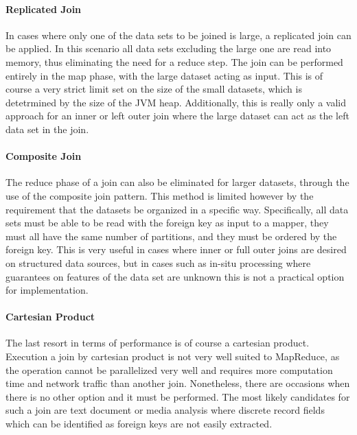 \paragraph{Replicated Join}
In cases where only one of the data sets to be joined is large, a replicated join can be applied. In this scenario all data sets excluding the large one are read into memory, thus eliminating the need for a reduce step. The join can be performed entirely in the map phase, with the large dataset acting as input. This is of course a very strict limit set on the size of the small datasets, which is detetrmined by the size of the JVM heap. Additionally, this is really only a valid approach for an inner or left outer join where the large dataset can act as the left data set in the join. 

\paragraph{Composite Join}
The reduce phase of a join can also be eliminated for larger datasets, through the use of the composite join pattern. This method is limited however by the requirement that the datasets be organized in a specific way. Specifically, all data sets must be able to be read with the foreign key as input to a mapper, they must all have the same number of partitions, and they must be ordered by the foreign key. This is very useful in cases where inner or full outer joins are desired on structured data sources, but in cases such as in-situ processing where guarantees on features of the data set are unknown this is not a practical option for implementation.

\paragraph{Cartesian Product}
The last resort in terms of performance is of course a cartesian product. Execution a join by cartesian product is not very well suited to MapReduce, as the operation cannot be parallelized very well and requires more computation time and network traffic than another join. Nonetheless, there are occasions when there is no other option and it must be performed. The most likely candidates for such a join are text document or media analysis where discrete record fields which can be identified as foreign keys are not easily extracted. 

